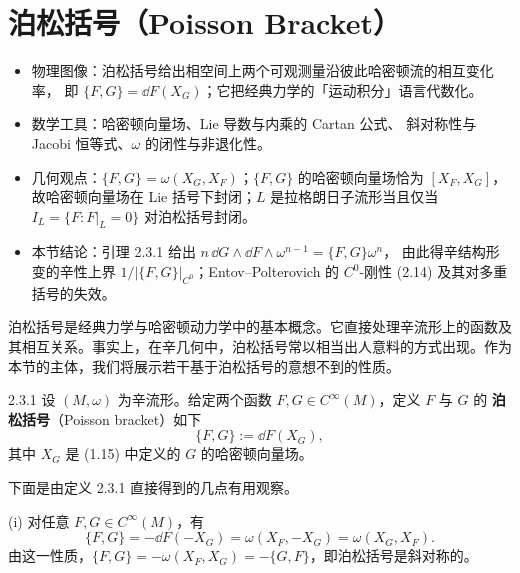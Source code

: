 \section{泊松括号（Poisson Bracket）}

\begin{keytakeaways}
\begin{itemize}
  \item 物理图像：泊松括号给出相空间上两个可观测量沿彼此哈密顿流的相互变化率，
        即 $\{F,G\}=\dd F(X_G)$；它把经典力学的「运动积分」语言代数化。
  \item 数学工具：哈密顿向量场、Lie 导数与内乘的 Cartan 公式、
        斜对称性与 Jacobi 恒等式、$\omega$ 的闭性与非退化性。
  \item 几何观点：$\{F,G\}=\omega(X_G,X_F)$；$\{F,G\}$ 的哈密顿向量场恰为
        $[X_F,X_G]$，故哈密顿向量场在 Lie 括号下封闭；$L$ 是拉格朗日子流形当且仅当
        $I_L=\{F:F|_L=0\}$ 对泊松括号封闭。
  \item 本节结论：引理 2.3.1 给出 $n\,\dd G\wedge\dd F\wedge\omega^{n-1}=\{F,G\}\omega^n$，
        由此得辛结构形变的辛性上界 $1/|\{F,G\}|_{C^0}$；Entov--Polterovich 的
        $C^0$-刚性 (2.14) 及其对多重括号的失效。
\end{itemize}
\end{keytakeaways}

泊松括号是经典力学与哈密顿动力学中的基本概念。它直接处理辛流形上的函数及其相互关系。事实上，在辛几何中，泊松括号常以相当出人意料的方式出现。作为本节的主体，我们将展示若干基于泊松括号的意想不到的性质。

\begin{wdefn}{2.3.1}
设 $(M,\omega)$ 为辛流形。给定两个函数 $F,G\in C^\infty(M)$，定义 $F$ 与 $G$ 的
\textbf{泊松括号}（Poisson bracket）如下
\begin{equation}
  \{F,G\}:=\dd F(X_G),
  \tag{2.8}
\end{equation}
其中 $X_G$ 是 (1.15) 中定义的 $G$ 的哈密顿向量场。
\end{wdefn}

下面是由定义 2.3.1 直接得到的几点有用观察。

(i) 对任意 $F,G\in C^\infty(M)$，有
\begin{equation}
  \{F,G\}=-\dd F(-X_G)=\omega(X_F,-X_G)=\omega(X_G,X_F).
  \tag{2.9}
\end{equation}
由这一性质，$\{F,G\}=-\omega(X_F,X_G)=-\{G,F\}$，即泊松括号是斜对称的。


